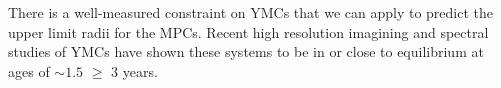 There is a well-measured constraint on YMCs that we can apply to predict the upper limit radii for the MPCs. Recent high resolution imagining and spectral studies of YMCs have shown these systems to be in or close to equilibrium at ages of $∼1.5$ $\geq$ $3$ years. \cite{Darwin_1900}